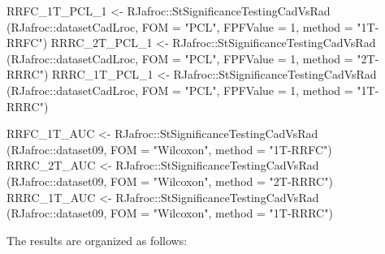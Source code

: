 \documentclass[
]{book}
\newenvironment{Shaded}{\begin{snugshade}}{\end{snugshade}}
\newcommand{\AttributeTok}[1]{\textcolor[rgb]{0.77,0.63,0.00}{#1}}
\newcommand{\DecValTok}[1]{\textcolor[rgb]{0.00,0.00,0.81}{#1}}
\newcommand{\FunctionTok}[1]{\textcolor[rgb]{0.00,0.00,0.00}{#1}}
\newcommand{\NormalTok}[1]{#1}
\newcommand{\OtherTok}[1]{\textcolor[rgb]{0.56,0.35,0.01}{#1}}
\newcommand{\SpecialCharTok}[1]{\textcolor[rgb]{0.00,0.00,0.00}{#1}}
\newcommand{\StringTok}[1]{\textcolor[rgb]{0.31,0.60,0.02}{#1}}
\begin{document}
\begin{Shaded}
\begin{Highlighting}[]
\NormalTok{RRFC\_1T\_PCL\_1 }\OtherTok{\textless{}{-}}\NormalTok{ RJafroc}\SpecialCharTok{::}\FunctionTok{StSignificanceTestingCadVsRad}\NormalTok{ (RJafroc}\SpecialCharTok{::}\NormalTok{datasetCadLroc, }
\AttributeTok{FOM =} \StringTok{"PCL"}\NormalTok{, }\AttributeTok{FPFValue =} \DecValTok{1}\NormalTok{, }\AttributeTok{method =} \StringTok{"1T{-}RRFC"}\NormalTok{)}
\NormalTok{RRRC\_2T\_PCL\_1 }\OtherTok{\textless{}{-}}\NormalTok{ RJafroc}\SpecialCharTok{::}\FunctionTok{StSignificanceTestingCadVsRad}\NormalTok{ (RJafroc}\SpecialCharTok{::}\NormalTok{datasetCadLroc, }
\AttributeTok{FOM =} \StringTok{"PCL"}\NormalTok{, }\AttributeTok{FPFValue =} \DecValTok{1}\NormalTok{, }\AttributeTok{method =} \StringTok{"2T{-}RRRC"}\NormalTok{)}
\NormalTok{RRRC\_1T\_PCL\_1 }\OtherTok{\textless{}{-}}\NormalTok{ RJafroc}\SpecialCharTok{::}\FunctionTok{StSignificanceTestingCadVsRad}\NormalTok{ (RJafroc}\SpecialCharTok{::}\NormalTok{datasetCadLroc, }
\AttributeTok{FOM =} \StringTok{"PCL"}\NormalTok{, }\AttributeTok{FPFValue =} \DecValTok{1}\NormalTok{, }\AttributeTok{method =} \StringTok{"1T{-}RRRC"}\NormalTok{)}

\NormalTok{RRFC\_1T\_AUC }\OtherTok{\textless{}{-}}\NormalTok{ RJafroc}\SpecialCharTok{::}\FunctionTok{StSignificanceTestingCadVsRad}\NormalTok{ (RJafroc}\SpecialCharTok{::}\NormalTok{dataset09, }
\AttributeTok{FOM =} \StringTok{"Wilcoxon"}\NormalTok{, }\AttributeTok{method =} \StringTok{"1T{-}RRFC"}\NormalTok{)}
\NormalTok{RRRC\_2T\_AUC }\OtherTok{\textless{}{-}}\NormalTok{ RJafroc}\SpecialCharTok{::}\FunctionTok{StSignificanceTestingCadVsRad}\NormalTok{ (RJafroc}\SpecialCharTok{::}\NormalTok{dataset09, }
\AttributeTok{FOM =} \StringTok{"Wilcoxon"}\NormalTok{, }\AttributeTok{method =} \StringTok{"2T{-}RRRC"}\NormalTok{)}
\NormalTok{RRRC\_1T\_AUC }\OtherTok{\textless{}{-}}\NormalTok{ RJafroc}\SpecialCharTok{::}\FunctionTok{StSignificanceTestingCadVsRad}\NormalTok{ (RJafroc}\SpecialCharTok{::}\NormalTok{dataset09, }
\AttributeTok{FOM =} \StringTok{"Wilcoxon"}\NormalTok{, }\AttributeTok{method =} \StringTok{"1T{-}RRRC"}\NormalTok{)}
\end{Highlighting}
\end{Shaded}

The results are organized as follows:
\end{document}
